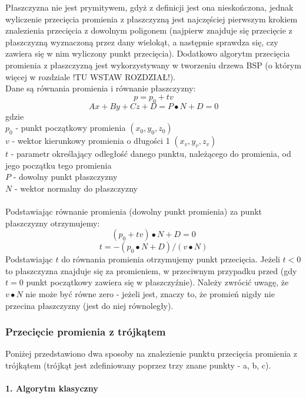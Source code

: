 Płaszczyzna nie jest prymitywem, gdyż z definicji jest ona nieskończona, jednak wyliczenie przecięcia promienia z płaszczyzną jest najczęściej pierwszym krokiem znalezienia przecięcia z dowolnym poligonem (najpierw znajduje się przecięcie z płaszczyzną wyznaczoną przez dany wielokąt, a następnie sprawdza się, czy zawiera się w nim wyliczony punkt przecięcia). Dodatkowo algorytm przecięcia promienia z płaszczyzną jest wykorzystywany w tworzeniu drzewa BSP (o którym więcej w rozdziale !TU WSTAW ROZDZIAŁ!). \\
\noindent
Dane są równania promienia i równanie płaszczyzny:
$$p = p_0 + tv$$
$$Ax + By + Cz + D = P \bullet N + D = 0$$
gdzie
\\
$p_0$ - punkt początkowy promienia $(x_0, y_0, z_0)$ \\
$v$ - wektor kierunkowy promienia o długości 1 $(x_v, y_v, z_v)$ \\
$t$ - parametr określający odległość danego punktu, należącego do promienia, od jego początku tego promienia \\
$P$ - dowolny punkt płaszczyzny \\
$N$ - wektor normalny do płaszczyzny \\
\\
Podstawiając równanie promienia (dowolny punkt promienia) za punkt płaszczyzny otrzymujemy:
$$(p_0 + tv) \bullet N + D = 0$$
$$t = -(p_0 \bullet N + D)/(v \bullet N)$$
Podstawiając $t$ do równania promienia otrzymujemy punkt przecięcia. Jeżeli $t < 0$ to płaszczyzna znajduje się za promieniem, w przeciwnym przypadku przed (gdy $t = 0$ punkt początkowy zawiera się w płaszczyźnie). Należy zwrócić uwagę, że $v \bullet N$ nie może być równe zero - jeżeli jest, znaczy to, że promień nigdy nie przecina płaszczyzny (jest do niej równoległy).

\subsubsection{Przecięcie promienia z trójkątem}

Poniżej przedstawiono dwa sposoby na znalezienie punktu przecięcia promienia z trójkątem (trójkąt jest zdefiniowany poprzez trzy znane punkty - a, b, c).


\paragraph{1. Algorytm klasyczny}\mbox{} \\


